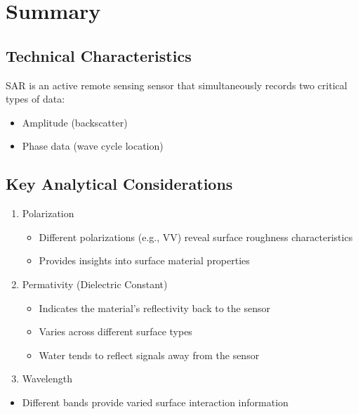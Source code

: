 \documentclass[
  letterpaper,
]{scrbook}
\providecommand{\tightlist}{%
  \setlength{\itemsep}{0pt}\setlength{\parskip}{0pt}}\usepackage{longtable,booktabs,array}
\begin{document}
\section{Summary}\label{summary-5}

\subsection{Technical Characteristics}\label{technical-characteristics}

SAR is an active remote sensing sensor that simultaneously records two
critical types of data:

\begin{itemize}
\item
  Amplitude (backscatter)
\item
  Phase data (wave cycle location)
\end{itemize}

\subsection{Key Analytical
Considerations}\label{key-analytical-considerations}

\begin{enumerate}
\def\labelenumi{\arabic{enumi}.}
\item
  Polarization

  \begin{itemize}
  \item
    Different polarizations (e.g., VV) reveal surface roughness
    characteristics
  \item
    Provides insights into surface material properties
  \end{itemize}
\item
  Permativity (Dielectric Constant)

  \begin{itemize}
  \item
    Indicates the material's reflectivity back to the sensor
  \item
    Varies across different surface types
  \item
    Water tends to reflect signals away from the sensor
  \end{itemize}
\item
  Wavelength
\end{enumerate}

\begin{itemize}
\tightlist
\item
  Different bands provide varied surface interaction information
\end{itemize}
\end{document}
